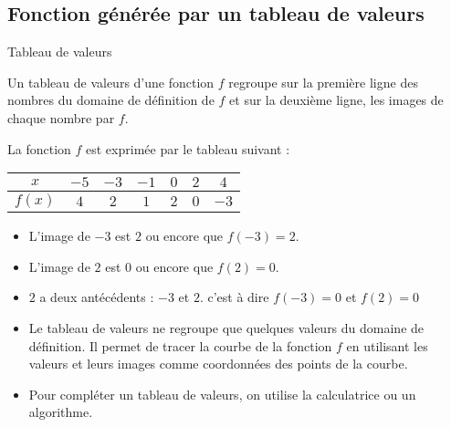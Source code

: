 \begin{pageCours} %


\subsection{Fonction générée par un tableau de valeurs}


\begin{DefT}{Tableau de valeurs}

Un tableau de valeurs d'une fonction $f$ regroupe sur la première ligne des nombres du domaine de définition de $f$ et sur la deuxième ligne, les images de chaque nombre par $f$.

\end{DefT}

 
\begin{Ex}

\begin{minipage}{0.5\linewidth}

La fonction $f$ est exprimée par le tableau suivant :

\begin{tabular}{|c|c|c|c|c|c|c|}
\hline 
$x$ & $-5$ &  $-3$ &  $-1$ &  $0$ &  $2$ &  $4$\\ 
\hline   
$f(x)$ & $4$ & $2$ & $1$ & $2$ & $0$ & $-3$ \\ 
\hline 
\end{tabular} 
\end{minipage}
\begin{minipage}{0.5\linewidth}
\begin{itemize}[leftmargin=*]
\item L'image de $-3$ est $2$ ou encore que $f(-3)=2$.
\item L'image de $2$ est $0$ ou encore que $f(2)=0$.
\item $2$ a deux antécédents : $-3$ et $2$. c'est à dire $f(-3)=0$ et $f(2)=0$
\end{itemize}
\end{minipage}
\end{Ex}

 
 
\begin{Rq}
\begin{itemize}
\item Le tableau de valeurs ne regroupe que quelques valeurs du domaine de définition. Il permet de tracer la courbe de la fonction $f$ en utilisant les valeurs et leurs images comme coordonnées des points de la courbe. 
\item Pour compléter un tableau de valeurs, on utilise la calculatrice ou un algorithme.
\end{itemize}
\end{Rq}


\end{pageCours}
